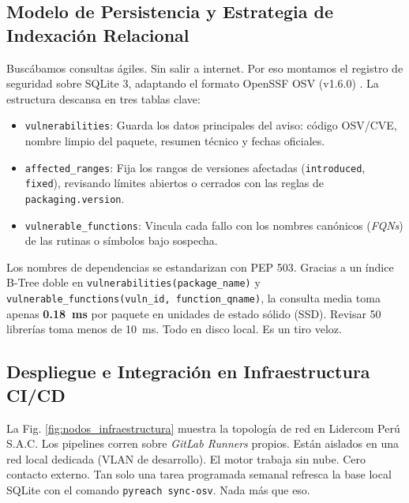 \documentclass[conference]{IEEEtran}
\begin{document}
\subsection{Modelo de Persistencia y Estrategia de Indexación Relacional}
Buscábamos consultas ágiles. Sin salir a internet. Por eso montamos el registro de seguridad sobre SQLite 3, adaptando el formato OpenSSF OSV (v1.6.0) \cite{openssf2023osv}. La estructura descansa en tres tablas clave:
\begin{itemize}
    \item \texttt{vulnerabilities}: Guarda los datos principales del aviso: código OSV/CVE, nombre limpio del paquete, resumen técnico y fechas oficiales.
    \item \texttt{affected\_ranges}: Fija los rangos de versiones afectadas (\texttt{introduced}, \texttt{fixed}), revisando límites abiertos o cerrados con las reglas de \texttt{packaging.version}.
    \item \texttt{vulnerable\_functions}: Vincula cada fallo con los nombres canónicos (\textit{FQNs}) de las rutinas o símbolos bajo sospecha.
\end{itemize}

Los nombres de dependencias se estandarizan con PEP 503. Gracias a un índice B-Tree doble en \texttt{vulnerabilities(package\_name)} y \texttt{vulnerable\_functions(vuln\_id, function\_qname)}, la consulta media toma apenas \textbf{0.18~ms} por paquete en unidades de estado sólido (SSD). Revisar 50 librerías toma menos de 10~ms. Todo en disco local. Es un tiro veloz.

\subsection{Despliegue e Integración en Infraestructura CI/CD}
La Fig. \ref{fig:nodos_infraestructura} muestra la topología de red en Lidercom Perú S.A.C. Los pipelines corren sobre \textit{GitLab Runners} propios. Están aislados en una red local dedicada (VLAN de desarrollo). El motor trabaja sin nube. Cero contacto externo. Tan solo una tarea programada semanal refresca la base local SQLite con el comando \texttt{pyreach sync-osv}. Nada más que eso.
\end{document}
